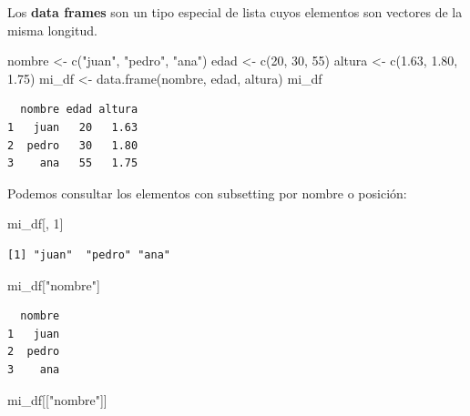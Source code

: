 \documentclass[
  letterpaper,
  DIV=11,
  numbers=noendperiod]{scrartcl}
\newenvironment{Shaded}{\begin{snugshade}}{\end{snugshade}}
\newcommand{\DecValTok}[1]{\textcolor[rgb]{0.68,0.00,0.00}{#1}}
\newcommand{\FloatTok}[1]{\textcolor[rgb]{0.68,0.00,0.00}{#1}}
\newcommand{\FunctionTok}[1]{\textcolor[rgb]{0.28,0.35,0.67}{#1}}
\newcommand{\NormalTok}[1]{\textcolor[rgb]{0.00,0.23,0.31}{#1}}
\newcommand{\OtherTok}[1]{\textcolor[rgb]{0.00,0.23,0.31}{#1}}
\newcommand{\StringTok}[1]{\textcolor[rgb]{0.13,0.47,0.30}{#1}}
\begin{document}
Los \textbf{data frames} son un tipo especial de lista cuyos elementos
son vectores de la misma longitud.

\begin{Shaded}
\begin{Highlighting}[]
\NormalTok{nombre }\OtherTok{\textless{}{-}} \FunctionTok{c}\NormalTok{(}\StringTok{"juan"}\NormalTok{, }\StringTok{"pedro"}\NormalTok{, }\StringTok{"ana"}\NormalTok{) }
\NormalTok{edad }\OtherTok{\textless{}{-}} \FunctionTok{c}\NormalTok{(}\DecValTok{20}\NormalTok{, }\DecValTok{30}\NormalTok{, }\DecValTok{55}\NormalTok{) }
\NormalTok{altura }\OtherTok{\textless{}{-}} \FunctionTok{c}\NormalTok{(}\FloatTok{1.63}\NormalTok{, }\FloatTok{1.80}\NormalTok{, }\FloatTok{1.75}\NormalTok{)}
\NormalTok{mi\_df }\OtherTok{\textless{}{-}} \FunctionTok{data.frame}\NormalTok{(nombre, edad, altura)}
\NormalTok{mi\_df}
\end{Highlighting}
\end{Shaded}

\begin{verbatim}
  nombre edad altura
1   juan   20   1.63
2  pedro   30   1.80
3    ana   55   1.75
\end{verbatim}

Podemos consultar los elementos con subsetting por nombre o posición:

\begin{Shaded}
\begin{Highlighting}[]
\NormalTok{mi\_df[, }\DecValTok{1}\NormalTok{] }
\end{Highlighting}
\end{Shaded}

\begin{verbatim}
[1] "juan"  "pedro" "ana"  
\end{verbatim}

\begin{Shaded}
\begin{Highlighting}[]
\NormalTok{mi\_df[}\StringTok{"nombre"}\NormalTok{] }
\end{Highlighting}
\end{Shaded}

\begin{verbatim}
  nombre
1   juan
2  pedro
3    ana
\end{verbatim}

\begin{Shaded}
\begin{Highlighting}[]
\NormalTok{mi\_df[[}\StringTok{"nombre"}\NormalTok{]] }
\end{Highlighting}
\end{Shaded}
\end{document}
